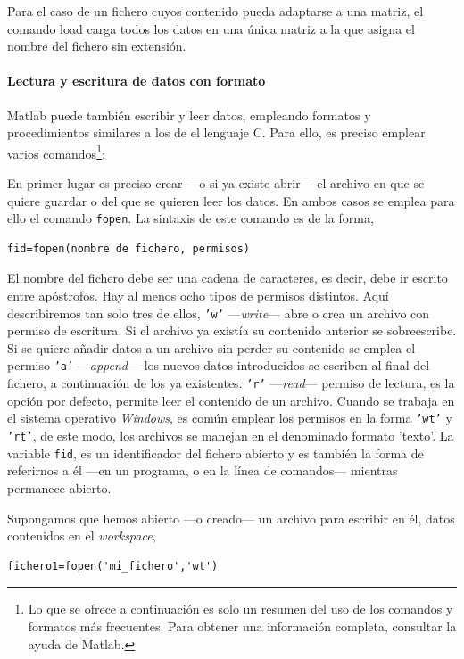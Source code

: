 Para el caso de un fichero cuyos contenido pueda adaptarse a una matriz, el comando load carga todos los datos en una única matriz a la que asigna el nombre del fichero sin extensión.

\paragraph*{Lectura y escritura de datos con formato} 

Matlab puede también escribir y leer datos, empleando formatos y procedimientos similares a los de el lenguaje C. Para ello, es preciso emplear varios comandos\footnote{Lo que se ofrece a continuación es solo un resumen del uso de los comandos y formatos más frecuentes. Para obtener una información completa, consultar la ayuda de Matlab.}:

En primer lugar es preciso crear ---o si ya existe abrir--- el archivo en que se quiere guardar o del que se quieren leer los datos. En ambos casos se emplea para ello el comando \texttt{fopen}. La sintaxis de este comando es de la forma,
\begin{verbatim}
fid=fopen(nombre de fichero, permisos)
\end{verbatim} 
El nombre del fichero debe ser una cadena de caracteres, es decir, debe ir escrito entre apóstrofos. Hay al menos ocho tipos de permisos distintos. Aquí describiremos tan solo tres de ellos, \texttt{'w'} ---\emph{write}--- abre o crea un archivo con permiso de escritura. Si el archivo ya existía su contenido anterior se sobreescribe. Si se quiere añadir datos a un archivo sin perder su contenido se emplea el permiso \texttt{'a'} ---\emph{append}--- los nuevos datos introducidos se escriben al final del fichero, a continuación de los ya existentes. \texttt{'r'} ---\emph{read}--- permiso de lectura, es la opción por defecto, permite leer el contenido de un archivo. Cuando se trabaja en el sistema operativo \emph{Windows}, es común emplear los permisos en la forma \texttt{'wt'} y \texttt{'rt'}, de este modo, los archivos se manejan en el denominado formato 'texto'. La variable \texttt{fid}, es un identificador del fichero abierto y es también la forma de referirnos a él ---en un programa, o en la línea de comandos--- mientras permanece abierto.

Supongamos que hemos abierto ---o creado--- un archivo para escribir en él, datos contenidos en el \emph{workspace}, 
\begin{verbatim}
fichero1=fopen('mi_fichero','wt') 
\end{verbatim}

